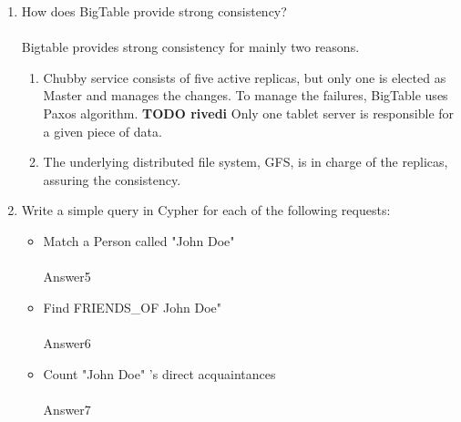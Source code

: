 \documentclass[]{report}
\begin{document}
\begin{enumerate}
 
 \item How does BigTable provide strong consistency?\\\\
 
 Bigtable provides strong consistency for mainly two reasons.
\begin{enumerate}
    \item Chubby service consists of five active replicas, but only one is elected as Master and manages the changes. 
    To manage the failures, BigTable uses Paxos algorithm. \textbf{TODO rivedi}
    Only one tablet server is responsible for a given piece of data. 
    \item The underlying distributed file system, GFS, is in charge of the replicas, assuring the consistency.
\end{enumerate}
 
 \item Write a simple query in Cypher for each of the following requests:
 \begin{itemize}
    	\item Match a Person called "John Doe"\\\\
	Answer5
        \item Find FRIENDS\_OF John Doe"\\\\
        Answer6
        \item Count "John Doe" 's direct acquaintances\\\\
        Answer7
  \end{itemize}

\end{enumerate}
\end{document}
